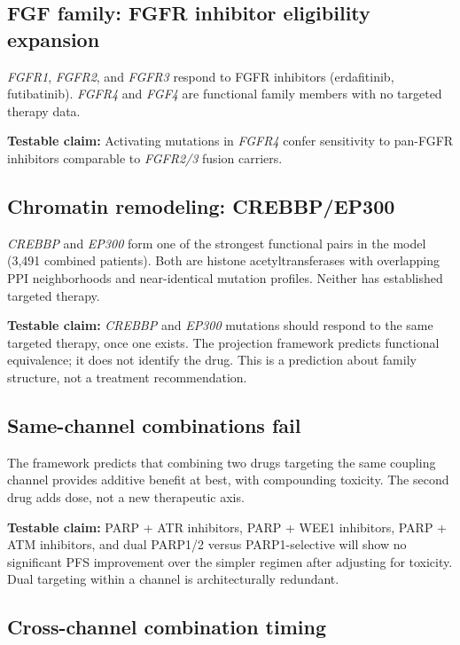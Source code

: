 \documentclass[11pt]{article}
\begin{document}
\subsection{FGF family: FGFR inhibitor eligibility expansion}

\emph{FGFR1}, \emph{FGFR2}, and \emph{FGFR3} respond to FGFR
inhibitors (erdafitinib, futibatinib). \emph{FGFR4} and
\emph{FGF4} are functional family members with no targeted
therapy data.

\textbf{Testable claim:} Activating mutations in \emph{FGFR4}
confer sensitivity to pan-FGFR inhibitors comparable to
\emph{FGFR2/3} fusion carriers.

\subsection{Chromatin remodeling: CREBBP/EP300}

\emph{CREBBP} and \emph{EP300} form one of the strongest functional
pairs in the model (3{,}491 combined patients). Both are histone
acetyltransferases with overlapping PPI neighborhoods and near-identical
mutation profiles. Neither has established targeted therapy.

\textbf{Testable claim:} \emph{CREBBP} and \emph{EP300} mutations
should respond to the same targeted therapy, once one exists. The
projection framework predicts functional equivalence; it does not
identify the drug. This is a prediction about family structure, not
a treatment recommendation.

\subsection{Same-channel combinations fail}

The framework predicts that combining two drugs targeting the same
coupling channel provides additive benefit at best, with compounding
toxicity. The second drug adds dose, not a new therapeutic axis.

\textbf{Testable claim:} PARP + ATR inhibitors, PARP + WEE1
inhibitors, PARP + ATM inhibitors, and dual PARP1/2 versus
PARP1-selective will show no significant PFS improvement over the
simpler regimen after adjusting for toxicity. Dual targeting within
a channel is architecturally redundant.

\subsection{Cross-channel combination timing}
\end{document}
